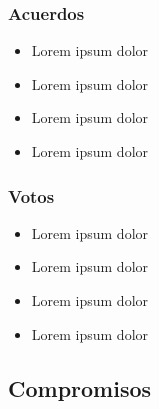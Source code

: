 \documentclass[]{book}
\providecommand{\tightlist}{%
  \setlength{\itemsep}{0pt}\setlength{\parskip}{0pt}}
\begin{document}
\subsubsection{Acuerdos}\label{acuerdos}

\begin{itemize}
\tightlist
\item
  Lorem ipsum dolor
\item
  Lorem ipsum dolor
\item
  Lorem ipsum dolor
\item
  Lorem ipsum dolor
\end{itemize}

\subsubsection{Votos}\label{votos}

\begin{itemize}
\tightlist
\item
  Lorem ipsum dolor
\item
  Lorem ipsum dolor
\item
  Lorem ipsum dolor
\item
  Lorem ipsum dolor
\end{itemize}

\subsection{Compromisos}\label{compromisos}
\end{document}
